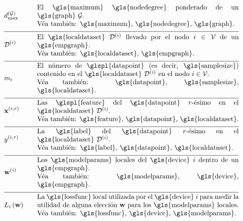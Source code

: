\begin{align} 
   &\maxnodedegree^{(\graph)} & \quad & \parbox{.85\textwidth}{El \gls{maximum} \gls{nodedegree} ponderado de un \gls{graph} $\graph$.
	   \\ Véa también: \gls{maximum}, \gls{nodedegree}, \gls{graph}.} \nonumber \\[2mm] \hline \nonumber\\[-5mm] 
   &\localdataset{\nodeidx} & \quad & \parbox{.85\textwidth}{El \gls{localdataset} $\localdataset{\nodeidx}$ llevado por 
	   el nodo $\nodeidx\in \nodes$ de un \gls{empgraph}.
	   \\ Véa también: \gls{localdataset}, \gls{empgraph}.} \nonumber \\[2mm] \hline \nonumber\\[-5mm]
   &\localsamplesize{\nodeidx} & \quad & \parbox{.85\textwidth}{El número de \glspl{datapoint} (es decir, \gls{samplesize}) contenido en el 
	   \gls{localdataset} $\localdataset{\nodeidx}$ en el nodo $\nodeidx\in \nodes$.
	   \\ Véa también: \gls{datapoint}, \gls{samplesize}, \gls{localdataset}.} \nonumber \\[2mm] \hline \nonumber\\[-5mm]
   &\featurevec^{(\nodeidx,\sampleidx)} & \quad & \parbox{.85\textwidth}{Las \glspl{feature} del \gls{datapoint} $\sampleidx$-ésimo en 
	   el \gls{localdataset} $\localdataset{\nodeidx}$.
	   \\ Véa también: \gls{feature}, \gls{datapoint}, \gls{localdataset}.} \nonumber \\[2mm] \hline \nonumber\\[-5mm]
   &\truelabel^{(\nodeidx,\sampleidx)} & \quad & \parbox{.85\textwidth}{La \gls{label} del \gls{datapoint} $\sampleidx$-ésimo en 
	   el \gls{localdataset} $\localdataset{\nodeidx}$.
	   \\ Véa también: \gls{label}, \gls{datapoint}, \gls{localdataset}.} \nonumber \\[2mm] \hline \nonumber\\[-5mm]
   &\localparams{\nodeidx} & \quad & \parbox{.85\textwidth}{Los \gls{modelparams} locales del \gls{device} $\nodeidx$ dentro de un \gls{empgraph}.
	   \\ Véa también: \gls{modelparams}, \gls{device}, \gls{empgraph}.} \nonumber \\[2mm] \hline \nonumber\\[-5mm]
   &\locallossfunc{\nodeidx}{\weights} & \quad & \parbox{.85\textwidth}{La \gls{lossfunc} local utilizada por el \gls{device} $\nodeidx$ 
	   para medir la utilidad de alguna elección $\weights$ para los \gls{modelparams} locales.
	   \\ Véa también: \gls{lossfunc}, \gls{device}, \gls{modelparams}.} \nonumber 
\end{align} 

